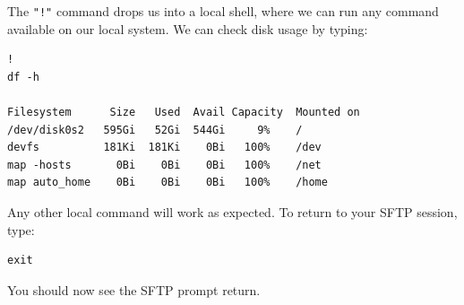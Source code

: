 \documentclass{article}
\begin{document}
The \verb+"!"+ command drops us into a local shell, where we can run any command available on our local system. We can check disk usage by typing:
\begin{verbatim}
!
df -h

Filesystem      Size   Used  Avail Capacity  Mounted on
/dev/disk0s2   595Gi   52Gi  544Gi     9%    /
devfs          181Ki  181Ki    0Bi   100%    /dev
map -hosts       0Bi    0Bi    0Bi   100%    /net
map auto_home    0Bi    0Bi    0Bi   100%    /home
\end{verbatim}
Any other local command will work as expected. To return to your SFTP session, type:
\begin{verbatim}
exit 
\end{verbatim}
You should now see the SFTP prompt return.



%         

%
%

\end{document}
